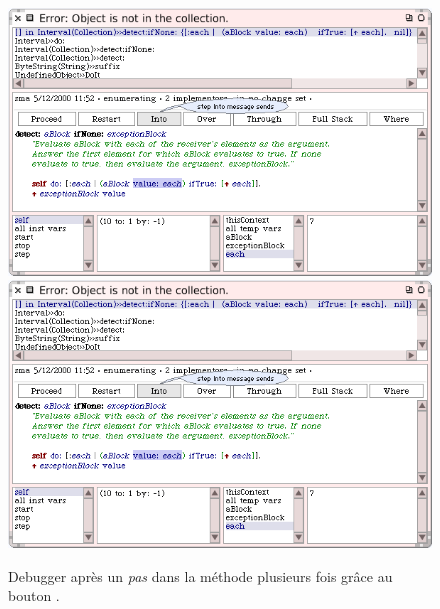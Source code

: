 \documentclass[a4paper,10pt,twoside]{book}
\begin{document}
\begin{figure}[btp]
	\begin{center}
	\ifluluelse
		{\includegraphics[width=\textwidth]{steppingIntoValue}}
		{\includegraphics[scale=0.7]{steppingIntoValue}}
	\end{center}
	\caption{Debugger apr\`es un \emph{pas} dans la m\'ethode  plusieurs fois gr\^ace au bouton .}
	\label{fig:steppingIntoValue}
\end{figure}
\end{document}
